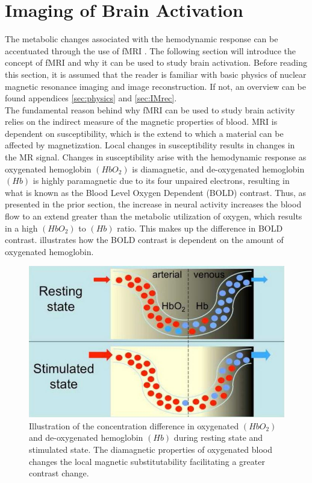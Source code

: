 
\section{Imaging of Brain Activation}

The metabolic changes associated with the hemodynamic response can be accentuated through the use of fMRI \cite{Glover2011}. The following section will introduce the concept of fMRI and why it can be used to study brain activation. Before reading this section, it is assumed that the reader is familiar with basic physics of nuclear magnetic resonance imaging and image reconstruction. If not, an overview can be found appendices \ref{sec:physics} and \ref{sec:IMrec}. \\
The fundamental reason behind why fMRI can be used to study brain activity relies on the indirect measure of the magnetic properties of blood. MRI is dependent on susceptibility, which is the extend to which a material can be affected by magnetization. Local changes in susceptibility results in changes in the MR signal. \cite{Syed2015} Changes in susceptibility arise with the hemodynamic response as oxygenated hemoglobin $(HbO_2)$ is diamagnetic, and de-oxygenated hemoglobin $(Hb)$ is highly paramagnetic due to its four unpaired electrons, resulting in what is known as the Blood Level Oxygen Dependent (BOLD) contrast. Thus, as presented in the prior section, the increase in neural activity increases the blood flow to an extend greater than the metabolic utilization of oxygen, which results in a high $(HbO_2)$ to $(Hb)$ ratio. This makes up the difference in BOLD contrast. \cite{Glover2011,Poldrack2011,Khanna2015}  illustrates how the BOLD contrast is dependent on the amount of oxygenated hemoglobin. 

\begin{figure}[H]                 
	\includegraphics[width=.47\textwidth]{figures/aBackground/bold_response}  
	\caption{Illustration of the concentration difference in oxygenated $(HbO_2)$ and de-oxygenated hemoglobin $(Hb)$ during resting state and stimulated state. The diamagnetic properties of oxygenated blood changes the local magnetic substitutability facilitating a greater contrast change. \cite{Glover2011}}
	\label{fig:back:bold} 
\end{figure}

